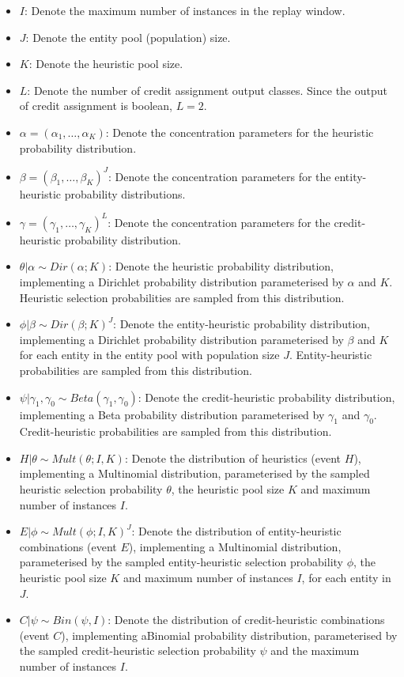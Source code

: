 \begin{itemize}
      \item $I$: Denote the maximum number of instances in the replay window.
      \item $J$: Denote the entity pool (population) size.
      \item $K$: Denote the heuristic pool size.
      \item $L$: Denote the number of credit assignment output classes. Since the output of credit assignment is boolean, $L = 2$.

      \item $\alpha = (\alpha_{1}, \dots, \alpha_{K})$: Denote the concentration parameters for the heuristic probability distribution.
      \item $\beta = (\beta_{1}, \dots, \beta_{K})^{J}$: Denote the concentration parameters for the entity-heuristic probability distributions.
      \item $\gamma = (\gamma_{1}, \dots, \gamma_{K})^{L}$: Denote the concentration parameters for the credit-heuristic probability distribution.

      \item $\theta \vert \alpha \sim Dir(\alpha; K)$: Denote the heuristic probability distribution, implementing a Dirichlet probability distribution parameterised by $\alpha$ and $K$. Heuristic selection probabilities are sampled from this distribution.
      \item $\phi \vert \beta \sim Dir(\beta; K)^{J}$: Denote the entity-heuristic probability distribution, implementing a Dirichlet probability distribution parameterised by $\beta$ and $K$ for each entity in the entity pool with population size $J$. Entity-heuristic probabilities are sampled from this distribution.
      \item $\psi \vert \gamma_{1}, \gamma_{0}  \sim Beta(\gamma_{1}, \gamma_{0})$: Denote the credit-heuristic probability distribution, implementing a Beta probability distribution parameterised by $\gamma_{1}$ and $\gamma_{0}$. Credit-heuristic probabilities are sampled from this distribution.

      \item $H \vert \theta \sim Mult(\theta; I, K)$: Denote the distribution of heuristics (event $H$), implementing a Multinomial distribution, parameterised by the sampled heuristic selection probability $\theta$, the heuristic pool size $K$ and maximum number of instances $I$.
      \item $E \vert \phi \sim Mult(\phi; I, K)^{J}$: Denote the distribution of entity-heuristic combinations (event $E$), implementing a Multinomial distribution, parameterised by the sampled entity-heuristic selection probability $\phi$, the heuristic pool size $K$ and maximum number of instances $I$, for each entity in $J$.
      \item $C \vert \psi \sim Bin(\psi, I)$: Denote the distribution of credit-heuristic combinations (event $C$), implementing aBinomial probability distribution, parameterised by the sampled credit-heuristic selection probability $\psi$ and the maximum number of instances $I$.
\end{itemize}

